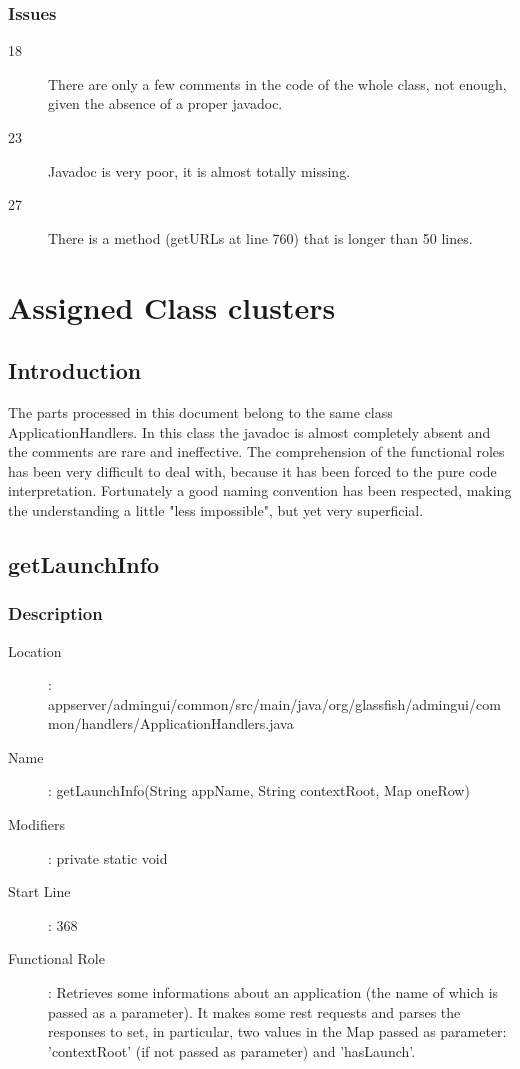 		\subsubsection{Issues}
		\begin{description}
			\item[18] There are only a few comments in the code of the whole class, not enough,
			given the absence of a proper javadoc.
			\item[23] Javadoc is very poor, it is almost totally missing.
			\item[27] There is a method (getURLs at line 760) that is longer than 50 lines.
		\end{description}
\clearpage
\section{Assigned Class clusters}
	\subsection{Introduction}
	The parts processed in this document belong to the same class ApplicationHandlers.
	In this class the javadoc is almost completely absent and the comments are rare and ineffective.
	The comprehension of the functional roles has been very difficult to deal with, because it has been
	forced to the pure code interpretation. Fortunately a good naming convention has been respected,
	making the understanding a little "less impossible", but yet very superficial.
	\subsection{getLaunchInfo}
		\subsubsection{Description}
		\begin{description}
		\item[Location]: appserver/admingui/common/src/main/java/org/glassfish/admingui/common/handlers/ApplicationHandlers.java
		\item[Name]: getLaunchInfo(String appName, String contextRoot, Map oneRow)
		\item[Modifiers]: private static void
		\item[Start Line]: 368
		\item[Functional Role]: Retrieves some informations about an application (the name of which is passed
		as a parameter). It makes some rest requests and parses the responses to set, in particular, two values
		in the Map passed as parameter: 'contextRoot' (if not passed as parameter) and 'hasLaunch'.
		\end{description}
		\newpage
